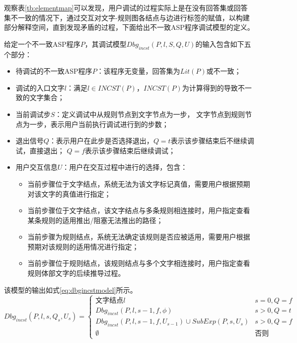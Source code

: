     观察表\ref{tb:elementmap}可以发现，用户调试的过程实际上是在没有回答集或回答集不一致的情况下，通过交互对文字-规则图各结点与边进行标签的赋值，以构建部分解释空间，直到发现矛盾的过程，下面给出不一致ASP程序调试模型的定义。
    \begin{definition}[]
        给定一个不一致ASP程序$P$，其调试模型$Dbg_{incst}(P, l, S, Q, U)$的输入包含如下五个部分：
        \begin{itemize}[topsep=0pt]
            \setlength\itemsep{-0.3em}
            \item 待调试的不一致ASP程序$P$：该程序无变量，回答集为$Lit(P)$或不一致；
            \item 调试的入口文字$l$：满足$l \in INCST(P)$，$INCST(P)$为计算得到的导致不一致的文字集合；
            \item 当前调试步$S$：定义调试中从规则节点到文字节点为一步， 文字节点到规则节点为一步，表示用户当前执行调试进行到的步数；
            \item 退出信号$Q$：表示用户在此步是否选择退出，$Q=t$表示该步骤结束后不继续调试，直接退出； $Q=f$表示该步骤结束后继续调试；
            \item 用户交互信息$U$：用户在交互过程中进行的选择，包含：
            \begin{itemize}[topsep=0pt, label=$\circ$]
                \setlength\itemsep{-0.3em}
                \item 当前步骤位于文字结点，系统无法为该文字标记真值，需要用户根据预期对该文字的真值进行指定；
                \item 当前步骤位于文字结点，该文字结点与多条规则相连接时，用户指定查看某条规则的适用推出/阻塞无法推出的路径；
                \item 当前步骤为规则结点，系统无法确定该规则是否应被适用，需要用户根据预期对该规则的适用情况进行指定；
                \item 当前步骤位于规则结点，该规则结点与多个文字相连接时，用户指定查看规则体部文字的后续推导过程。
            \end{itemize}
        \end{itemize}
    \end{definition}
        
        该模型的输出如式\eqref{eq:dbgincstmodel}所示。
        \begin{equation}
            \label{eq:dbgincstmodel}
            Dbg_{incst}(P, l, s, Q_s, U_s)=
            \begin{cases}
                \text{文字结点} l &s = 0, Q = f\\
                Dbg_{incst}(P, l, s-1, f, \phi) &s > 0, Q = t\\
                Dbg_{incst}(P, l, s-1, f, U_{s-1}) \cup SubExp(P, s, U_s) &s > 0, Q = f\\
                \emptyset &\text{否则}
            \end{cases}
        \end{equation}
    
